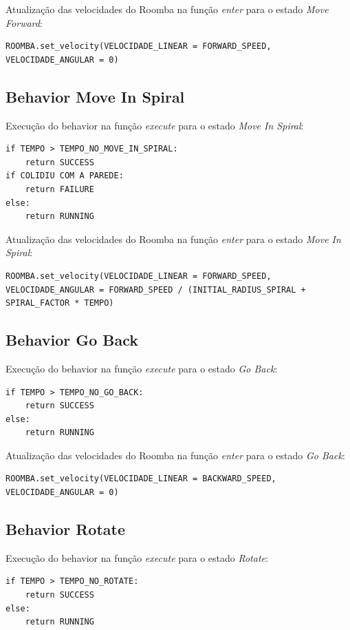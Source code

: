 \documentclass[conference]{IEEEtran}
\begin{document}
Atualização das velocidades do Roomba na função \textit{enter} para o estado \textit{Move Forward}:
\begin{lstlisting}
ROOMBA.set_velocity(VELOCIDADE_LINEAR = FORWARD_SPEED, VELOCIDADE_ANGULAR = 0)
\end{lstlisting}

\subsection{Behavior Move In Spiral}
Execução do behavior na função \textit{execute} para o estado \textit{Move In Spiral}:
\begin{lstlisting}
if TEMPO > TEMPO_NO_MOVE_IN_SPIRAL:
	return SUCCESS
if COLIDIU COM A PAREDE:
	return FAILURE
else:
	return RUNNING
\end{lstlisting}

Atualização das velocidades do Roomba na função \textit{enter} para o estado \textit{Move In Spiral}:
\begin{lstlisting}
ROOMBA.set_velocity(VELOCIDADE_LINEAR = FORWARD_SPEED, VELOCIDADE_ANGULAR = FORWARD_SPEED / (INITIAL_RADIUS_SPIRAL + SPIRAL_FACTOR * TEMPO)
\end{lstlisting}

\subsection{Behavior Go Back}
Execução do behavior na função \textit{execute} para o estado \textit{Go Back}:
\begin{lstlisting}
if TEMPO > TEMPO_NO_GO_BACK:
	return SUCCESS
else:
	return RUNNING
\end{lstlisting}

Atualização das velocidades do Roomba na função \textit{enter} para o estado \textit{Go Back}:
\begin{lstlisting}
ROOMBA.set_velocity(VELOCIDADE_LINEAR = BACKWARD_SPEED, VELOCIDADE_ANGULAR = 0)
\end{lstlisting}

\subsection{Behavior Rotate}
Execução do behavior na função \textit{execute} para o estado \textit{Rotate}:
\begin{lstlisting}
if TEMPO > TEMPO_NO_ROTATE:
	return SUCCESS
else:
	return RUNNING
\end{lstlisting}
\end{document}

